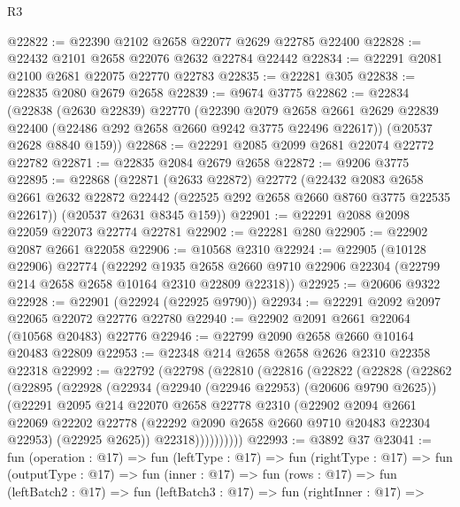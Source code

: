 \begin{lexlean}{R3}
\begin{coremodule}
@22822 := @22390 @2102 @2658 @22077 @2629 @22785 @22400
@22828 := @22432 @2101 @2658 @22076 @2632 @22784 @22442
@22834 := @22291 @2081 @2100 @2681 @22075 @22770 @22783
@22835 := @22281 @305
@22838 := @22835 @2080 @2679 @2658
@22839 := @9674 @3775
@22862 := @22834
    (@22838
      (@2630 @22839)
      @22770
      (@22390
        @2079
        @2658
        @2661
        @2629
        @22839
        @22400
        (@22486 @292 @2658 @2660 @9242 @3775 @22496 @22617))
      (@20537 @2628 @8840 @159))
@22868 := @22291 @2085 @2099 @2681 @22074 @22772 @22782
@22871 := @22835 @2084 @2679 @2658
@22872 := @9206 @3775
@22895 := @22868
    (@22871
      (@2633 @22872)
      @22772
      (@22432
        @2083
        @2658
        @2661
        @2632
        @22872
        @22442
        (@22525 @292 @2658 @2660 @8760 @3775 @22535 @22617))
      (@20537 @2631 @8345 @159))
@22901 := @22291 @2088 @2098 @22059 @22073 @22774 @22781
@22902 := @22281 @280
@22905 := @22902 @2087 @2661 @22058
@22906 := @10568 @2310
@22924 := @22905
    (@10128 @22906)
    @22774
    (@22292
      @1935
      @2658
      @2660
      @9710
      @22906
      @22304
      (@22799 @214 @2658 @2658 @10164 @2310 @22809 @22318))
@22925 := @20606 @9322
@22928 := @22901 (@22924 (@22925 @9790))
@22934 := @22291 @2092 @2097 @22065 @22072 @22776 @22780
@22940 := @22902 @2091 @2661 @22064 (@10568 @20483) @22776
@22946 := @22799 @2090 @2658 @2660 @10164 @20483 @22809
@22953 := @22348 @214 @2658 @2658 @2626 @2310 @22358 @22318
@22992 := @22792
    (@22798
      (@22810
        (@22816
          (@22822
            (@22828
              (@22862
                (@22895
                  (@22928
                    (@22934
                      (@22940 (@22946 @22953) (@20606 @9790 @2625))
                      (@22291
                        @2095
                        @214
                        @22070
                        @2658
                        @22778
                        @2310
                        (@22902
                          @2094
                          @2661
                          @22069
                          @22202
                          @22778
                          (@22292 @2090 @2658 @2660 @9710 @20483 @22304 @22953)
                          (@22925 @2625))
                        @22318))))))))))
@22993 := @3892 @37
@23041 := fun (operation : @17) =>
  fun (leftType : @17) =>
  fun (rightType : @17) =>
  fun (outputType : @17) =>
  fun (inner : @17) =>
  fun (rows : @17) =>
  fun (leftBatch2 : @17) =>
  fun (leftBatch3 : @17) =>
  fun (rightInner : @17) =>

\end{coremodule}
\end{lexlean}
